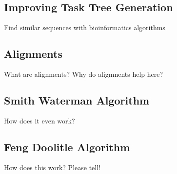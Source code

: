 \subsection{Improving Task Tree Generation}
Find similar sequences with bioinformatics algorithms

\subsection{Alignments}
What are alignments? Why do aligmnents help here?

\subsection{Smith Waterman Algorithm}
How does it even work?

\subsection{Feng Doolitle Algorithm}
How does this work? Please tell!


